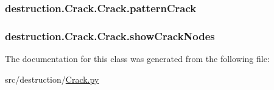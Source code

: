 \hypertarget{classdestruction_1_1_crack_1_1_crack_af96e7c2c5a92eaccc8de9dac13c1b3d2}{
\subsubsection[{pattern\-Crack}]{\setlength{\rightskip}{0pt plus 5cm}destruction.\-Crack.\-Crack.\-pattern\-Crack}}\label{classdestruction_1_1_crack_1_1_crack_af96e7c2c5a92eaccc8de9dac13c1b3d2}
\hypertarget{classdestruction_1_1_crack_1_1_crack_a13a5df6b24e4fc63260f854263afb058}{
\subsubsection[{show\-Crack\-Nodes}]{\setlength{\rightskip}{0pt plus 5cm}destruction.\-Crack.\-Crack.\-show\-Crack\-Nodes}}\label{classdestruction_1_1_crack_1_1_crack_a13a5df6b24e4fc63260f854263afb058}


The documentation for this class was generated from the following file\-:\begin{DoxyCompactItemize}
\item 
src/destruction/\hyperlink{_crack_8py}{Crack.\-py}\end{DoxyCompactItemize}
